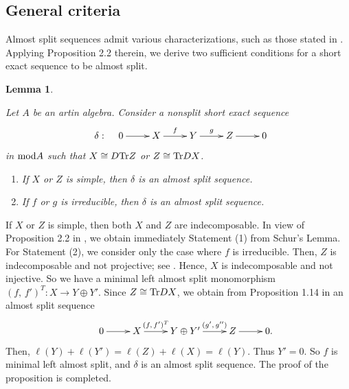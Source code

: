 \documentclass[10pt]{amsart}
\newtheorem{Lemma}[Theo]{Lemma}
\theoremstyle{definition}
\newcommand{\mmod}{{\rm mod}}
\begin{document}
\subsection{\sc General criteria} Almost split sequences admit various characterizations, such as those stated in \cite[Chapter V]{ARS}. Applying Proposition 2.2 therein, we derive two sufficient conditions for a short exact sequence to be almost split.

\begin{Lemma}\label{ass-sim}

Let $A$ be an artin algebra. Consider a nonsplit short exact sequence \vspace{-9.5pt}
$$\xymatrix{\delta: \hspace{-20pt} & 0\ar[r] & X\ar[r]^-f & Y \ar[r]^-g & Z\ar[r] & 0}\vspace{0pt}$$ in $\mmod A$ such that $X\cong D{\rm Tr}Z$ or $Z\cong {\rm Tr} D X$. 

\begin{enumerate}[$(1)$]

\vspace{-2pt}

\item If $X$ or $Z$ is simple, then $\delta$ is an almost split sequence.

\item If $f$ or $g$ is irreducible, then $\delta$ is an almost split sequence.

\end{enumerate}\end{Lemma}

\vspace{-1.5pt}

 If $X$ or $Z$ is simple, then both $X$ and $Z$ are indecomposable. In view of 
Proposition 2.2 in \cite[Chapter V]{ARS}, we obtain immediately Statement (1) from Schur's Lemma. For Statement (2), we consider only the case where $f$ is irreducible. Then, $Z$ is indecomposable and not projective; see \cite[(V.5.6)]{ARS}. Hence, $X$ is indecomposable and not injective. So we have a minimal left almost split monomorphism $(f, \, f')^T: X\to Y\oplus Y'.$ Since $Z\cong {\rm Tr}D X$, we obtain from Proposition 1.14 in \cite[Chapter V]{ARS} an almost split sequence \vspace{-5pt}
$$\hspace{15pt}\xymatrix{0\ar[r] & X\ar[r]^-{(f, \, f')^T} & Y\oplus Y' \ar[r]^-{(g', \, g'')} & Z\ar[r] & 0.}\vspace{-3pt}$$ 
Then, $\ell(Y)+\ell(Y')=\ell(Z)+\ell(X)=\ell(Y)$. Thus $Y'=0.$ So $f$ is minimal left almost split, and $\delta$ is an almost split sequence. The proof of the proposition is completed.
\end{document}
